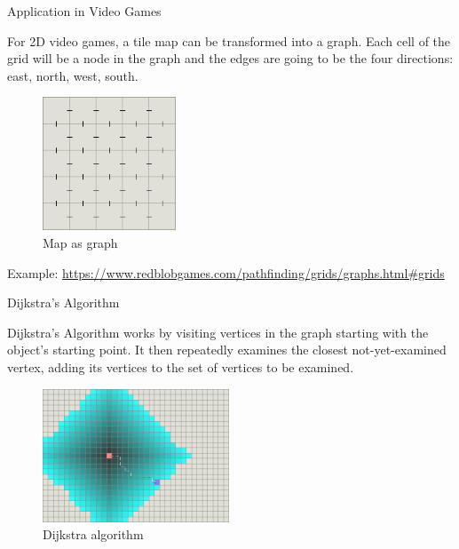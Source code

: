 \documentclass[ignorenonframetext,]{beamer}
\begin{document}
\begin{frame}{Application in Video Games}
\protect\hypertarget{application-in-video-games}{}

For 2D video games, a tile map can be transformed into a graph. Each
cell of the grid will be a node in the graph and the edges are going to
be the four directions: east, north, west, south.

\begin{figure}
\centering
\includegraphics[width=\textwidth,height=1.5625in]{map-as-graph.png}
\caption{Map as graph}
\end{figure}

Example:
\url{https://www.redblobgames.com/pathfinding/grids/graphs.html\#grids}

\end{frame}

\begin{frame}{Dijkstra's Algorithm}
\protect\hypertarget{dijkstras-algorithm}{}

Dijkstra's Algorithm works by visiting vertices in the graph starting
with the object's starting point. It then repeatedly examines the
closest not-yet-examined vertex, adding its vertices to the set of
vertices to be examined.

\begin{figure}
\centering
\includegraphics[width=\textwidth,height=1.5625in]{dijkstra.png}
\caption{Dijkstra algorithm}
\end{figure}

\end{frame}
\end{document}
